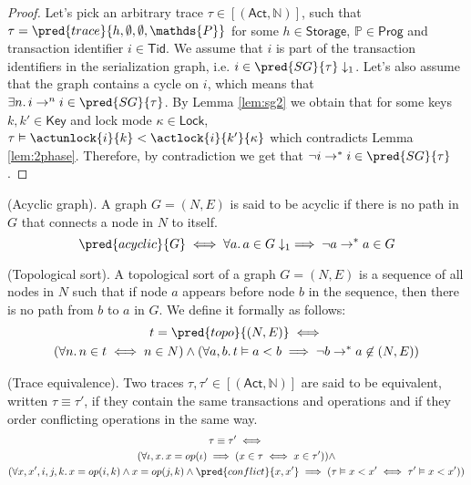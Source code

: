 \begin{proof}
Let's pick an arbitrary trace $\tau \in [(\mathsf{Act}, \mathds{N})]$, such that $\tau = \pred{trace}{h, \emptyset, \emptyset, \mathds{P}}$ for some $h \in \mathsf{Storage}$, $\mathds{P} \in \mathsf{Prog}$ and transaction identifier $i \in \mathsf{Tid}$. We assume that $i$ is part of the transaction identifiers in the serialization graph, i.e. $i \in \pred{SG}{\tau} \downarrow_1$. Let's also assume that the graph contains a cycle on $i$, which means that $\exists n \ldotp i \rightarrow^n i \in \pred{SG}{\tau}$. By Lemma \ref{lem:sg2} we obtain that for some keys $k, k' \in \mathsf{Key}$ and lock mode $\kappa \in \mathsf{Lock}$, $\tau \vDash \actunlock{i}{k} < \actlock{i}{k'}{\kappa}$ which contradicts Lemma \ref{lem:2phase}. Therefore, by contradiction we get that $\lnot i \rightarrow^* i \in \pred{SG}{\tau}$.
\end{proof}

 (Acyclic graph). A graph $G = (N, E)$ is said to be acyclic if there is no path in $G$ that connects a node in $N$ to itself.
\[
	\pred{acyclic}{G} \iff \forall a \ldotp a \in G \downarrow_1 \implies \lnot a \rightarrow^* a \in G
\]

 (Topological sort). A topological sort of a graph $G = (N, E)$ is a sequence of all nodes in $N$ such that if node $a$ appears before node $b$ in the sequence, then there is no path from $b$ to $a$ in $G$. We define it formally as follows:
\begin{gather*}
	t = \pred{topo}{(N, E)} \iff \\
	(\forall n \ldotp n \in t \iff n \in N) \land (\forall a, b \ldotp t \vDash a < b \implies \lnot b \rightarrow^* a \not\in (N, E))
\end{gather*}

 (Trace equivalence). Two traces $\tau, \tau' \in [(\mathsf{Act}, \mathds{N})]$ are said to be equivalent, written $\tau \equiv \tau'$, if they contain the same transactions and operations and if they order conflicting operations in the same way.
\begin{gather*}
	\tau \equiv \tau' \iff \\
	(\forall \iota, x \ldotp x = op(\iota) \implies (x \in \tau \iff x \in \tau')) \land \\
	(\forall x, x', i, j, k \ldotp x = op(i, k) \land x = op(j, k) \land \pred{conflict}{x, x'}
	\implies (\tau \vDash x < x' \iff \tau' \vDash x < x'))
\end{gather*}


